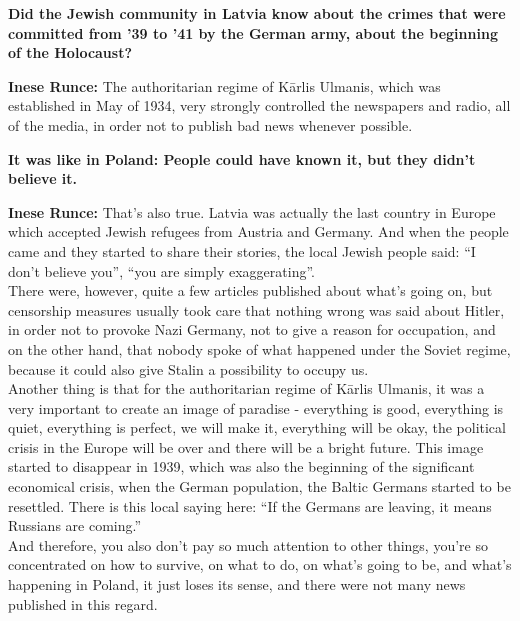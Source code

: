\textbf{Did the Jewish community in Latvia know about the crimes that were committed from '39 to '41 by the German army, about the beginning of the Holocaust?}

\textbf{Inese Runce:} The authoritarian regime of Kārlis Ulmanis, which was established in May of 1934, very strongly controlled the newspapers and radio, all of the media, in order not to publish bad news whenever possible.

\textbf{It was like in Poland: People could have known it, but they didn’t believe it.}

\textbf{Inese Runce:} That’s also true. Latvia was actually the last country in Europe which accepted Jewish refugees from Austria and Germany. And when the people came and they started to share their stories, the local Jewish people said: ``I don’t believe you'', ``you are simply exaggerating''.\\
There were, however, quite a few articles published about what’s going on, but censorship measures usually took care that nothing wrong was said about Hitler, in order not to provoke Nazi Germany, not to give a reason for occupation, and on the other hand, that nobody spoke of what happened under the Soviet regime, because it could also give Stalin a possibility to occupy us.\\
Another thing is that for the authoritarian regime of Kārlis Ulmanis, it was a very important to create an image of paradise - everything is good, everything is quiet, everything is perfect, we will make it, everything will be okay, the political crisis in the Europe will be over and there will be a bright future. This image started to disappear in 1939, which was also the beginning of the significant economical crisis, when the German population, the Baltic Germans started to be resettled. There is this local saying here: ``If the Germans are leaving, it means Russians are coming.''\\
And therefore, you also don't pay so much attention to other things, you're so concentrated on how to survive, on what to do, on what's going to be, and what's happening in Poland, it just loses its sense, and there were not many news published in this regard.